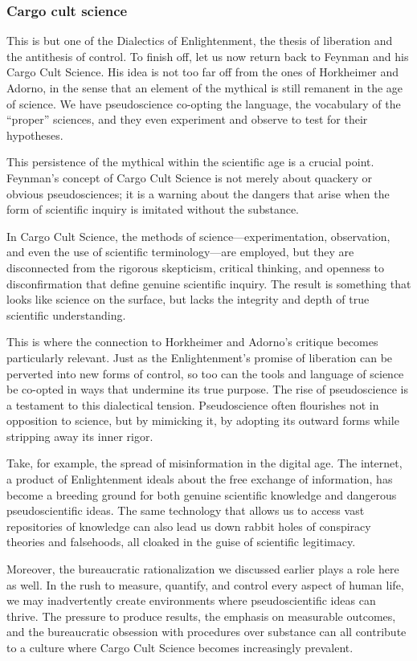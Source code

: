 \subsubsection*{Cargo cult science}
This is but one of the Dialectics of Enlightenment, the thesis of liberation
and the antithesis of control. To finish off, let us now return back to Feynman
and his Cargo Cult Science. His idea is not too far off from the ones of
Horkheimer and Adorno, in the sense that an element of the mythical is still
remanent in the age of science. We have pseudoscience co-opting the language,
the vocabulary of the \enquote{proper} sciences, and they even experiment and
observe to test for their hypotheses. 

This persistence of the mythical within the scientific age is a crucial point.
Feynman’s concept of Cargo Cult Science is not merely about quackery or obvious
pseudosciences; it is a warning about the dangers that arise when the form of
scientific inquiry is imitated without the substance.

In Cargo Cult Science, the methods of science—experimentation, observation, and
even the use of scientific terminology—are employed, but they are disconnected
from the rigorous skepticism, critical thinking, and openness to
disconfirmation that define genuine scientific inquiry. The result is something
that looks like science on the surface, but lacks the integrity and depth of
true scientific understanding.

This is where the connection to Horkheimer and Adorno's critique becomes
particularly relevant. Just as the Enlightenment's promise of liberation can be
perverted into new forms of control, so too can the tools and language of
science be co-opted in ways that undermine its true purpose. The rise of
pseudoscience is a testament to this dialectical tension. Pseudoscience often
flourishes not in opposition to science, but by mimicking it, by adopting its
outward forms while stripping away its inner rigor.

Take, for example, the spread of misinformation in the digital age. The
internet, a product of Enlightenment ideals about the free exchange of
information, has become a breeding ground for both genuine scientific knowledge
and dangerous pseudoscientific ideas. The same technology that allows us to
access vast repositories of knowledge can also lead us down rabbit holes of
conspiracy theories and falsehoods, all cloaked in the guise of scientific
legitimacy.

Moreover, the bureaucratic rationalization we discussed earlier plays a role
here as well. In the rush to measure, quantify, and control every aspect of
human life, we may inadvertently create environments where pseudoscientific
ideas can thrive. The pressure to produce results, the emphasis on measurable
outcomes, and the bureaucratic obsession with procedures over substance can all
contribute to a culture where Cargo Cult Science becomes increasingly
prevalent.

